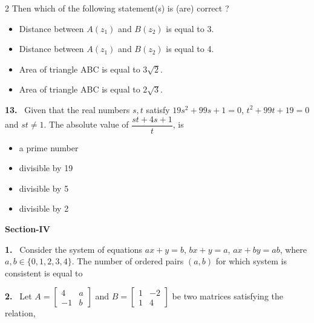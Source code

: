 \documentclass[10pt]{extarticle}
\newcommand{\sect}[1]{\par\smallskip\noindent\textbf{#1}\par}
\newcommand{\qn}[1]{\par\smallskip\noindent\textbf{#1.}~}
\newenvironment{qoptions}{\begin{itemize}[leftmargin=1.8em,itemsep=1pt,topsep=2pt,label={}]}{\end{itemize}}
\newcommand{\opt}[2]{\item[(#1)] #2}
\begin{document}
\begin{multicols}{2}
Then which of the following statement(s) is (are) correct ?
\begin{qoptions}
\opt{A}{Distance between $A(z_1)$ and $B(z_2)$ is equal to 3.}
\opt{B}{Distance between $A(z_1)$ and $B(z_2)$ is equal to 4.}
\opt{C}{Area of triangle ABC is equal to $3\sqrt2$.}
\opt{D}{Area of triangle ABC is equal to $2\sqrt3$.}
\end{qoptions}
\qn{13} Given that the real numbers $s,t$ satisfy $19s^2+99s+1=0$, $t^2+99t+19=0$ and $st\ne1$. The absolute value of $\dfrac{st+4s+1}{t}$, is
\begin{qoptions}
\opt{A}{a prime number}
\opt{B}{divisible by 19}
\opt{C}{divisible by 5}
\opt{D}{divisible by 2}
\end{qoptions}
\sect{Section-IV}
\qn{1} Consider the system of equations $ax+y=b$, $bx+y=a$, $ax+by=ab$, where $a,b\in\{0,1,2,3,4\}$. The number of ordered pairs $(a,b)$ for which system is consistent is equal to
\qn{2} Let $A=\begin{bmatrix}4&a\\-1&b\end{bmatrix}$ and $B=\begin{bmatrix}1&-2\\1&4\end{bmatrix}$ be two matrices satisfying the relation,


\end{multicols}
\end{document}
